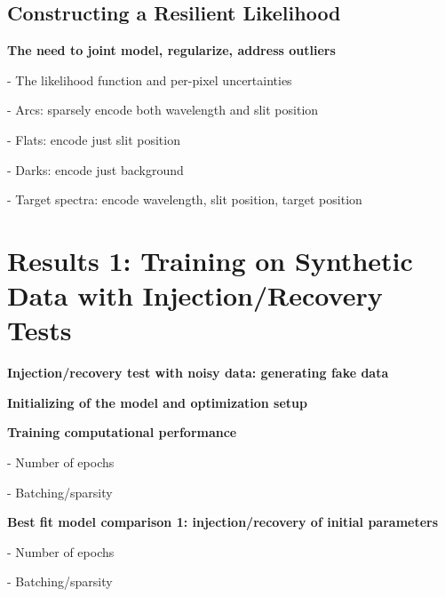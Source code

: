 \documentclass[twocolumn]{aastex63}
\begin{document}
\subsection{Constructing a Resilient Likelihood}
\begin{mdframed}
  \textbf{The need to joint model, regularize, address outliers} \par
  - The likelihood function and per-pixel uncertainties\par
  - Arcs: sparsely encode both wavelength and slit position\par
  - Flats: encode just slit position\par
  - Darks: encode just background\par
  - Target spectra: encode wavelength, slit position, target position\par
  \textcolor{lightgray}{\lipsum[7]}
\end{mdframed}


\section{Results 1: Training on Synthetic Data with Injection/Recovery Tests}

\begin{mdframed}
  \textbf{Injection/recovery test with noisy data: generating fake data} \par
  \textcolor{lightgray}{\lipsum[9]}
\end{mdframed}

\begin{mdframed}
  \textbf{Initializing of the model and optimization setup} \par
  \textcolor{lightgray}{\lipsum[10]}
\end{mdframed}


\begin{mdframed}
  \textbf{Training computational performance} \par
  - Number of epochs\par
  - Batching/sparsity\par
  \textcolor{lightgray}{\lipsum[9]}
\end{mdframed}

\begin{mdframed}
  \textbf{Best fit model comparison 1: injection/recovery of initial parameters} \par
  - Number of epochs\par
  - Batching/sparsity\par
  \textcolor{lightgray}{\lipsum[10]}
\end{mdframed}
\end{document}
